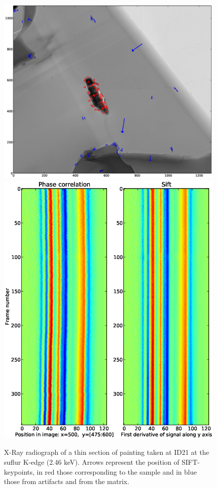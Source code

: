 \documentclass[preprint]{iucr}
\begin{document}
\begin{figure}
\label{fig:sample}
\begin{center}
\includegraphics[width=15cm]{features.eps}
\includegraphics[width=15cm]{alignment.eps}
\caption{ X-Ray radiograph of a thin section of painting
taken at ID21 at the suflur K-edge (2.46 keV). Arrows represent the position of
SIFT-keypoints, in red those corresponding to the sample and in blue those from artifacts and from
the matrix.}
\end{center}
\end{figure}
\end{document}
